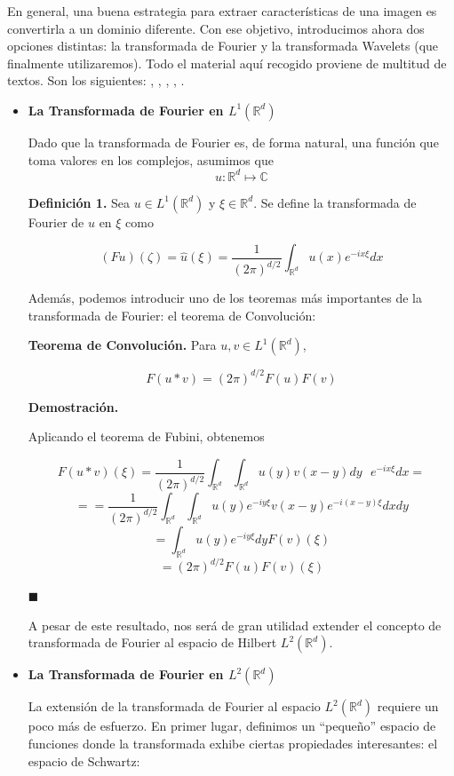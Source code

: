 En general, una buena estrategia para extraer características de una imagen es convertirla a un dominio diferente. Con ese objetivo, introducimos ahora dos opciones distintas: la transformada de Fourier y la transformada Wavelets (que finalmente utilizaremos). Todo el material aquí recogido proviene de multitud de textos. Son los siguientes: \cite{math-image}, \cite{canada}, \cite{daube}, \cite{castro}, \cite{misiti}.

\begin{itemize}
	\item \textbf{La Transformada de Fourier en $L^1(\mathbb{R}^d)$}
	
	Dado que la transformada de Fourier es, de forma natural, una función que toma valores en los complejos, asumimos que
	$$u: \mathbb{R}^d \mapsto \mathbb{C}$$
	
	\textbf{Definición 1.} Sea $u \in L^1(\mathbb{R}^d)$ y $\xi \in \mathbb{R}^d$. Se define la transformada de Fourier de $u$ en $\xi$ como 
	
	$$(F u)(\zeta) = \hat{u}(\xi) = \frac{1}{(2\pi)^{d/2}} \int_{\mathbb{R}^d} u(x) e^{-ix\xi}dx$$


Además, podemos introducir uno de los teoremas más importantes de la transformada de Fourier: el teorema de Convolución: 

\textbf{Teorema de Convolución.} Para $u, v \in L^1(\mathbb{R}^d)$,

$$ F(u*v) = (2\pi)^{d/2}F(u)F(v)$$

\textbf{Demostración.}


Aplicando el teorema de Fubini, obtenemos

$$F(u*v)(\xi) = \frac{1}{(2\pi)^{d/2}} \int_{\mathbb{R}^d} \int_{\mathbb{R}^d} u(y) v(x-y) dy\text{ } e^{-ix\xi} dx = $$
$$ == \frac{1}{(2\pi)^{d/2}} \int_{\mathbb{R}^d} \int_{\mathbb{R}^d} u(y)e^{-iy\xi}v(x-y)e^{-i(x-y)\xi}dxdy$$
$$ = \int_{\mathbb{R}^d} u(y) e^{-iy\xi} dy F(v)(\xi)$$
$$ = (2\pi)^{d/2}F(u)F(v)(\xi)$$

\hfill$\blacksquare$

A pesar de este resultado, nos será de gran utilidad extender el concepto de transformada de Fourier al espacio de Hilbert $L^2(\mathbb{R}^d)$.

\item \textbf{La Transformada de Fourier en $L^2(\mathbb{R}^d)$}

La extensión de la transformada de Fourier al espacio $L^2(\mathbb{R}^d)$ requiere un poco más de esfuerzo. En primer lugar, definimos un ``pequeño'' espacio de funciones donde la transformada exhibe ciertas propiedades interesantes: el espacio de Schwartz:


\end{itemize}
